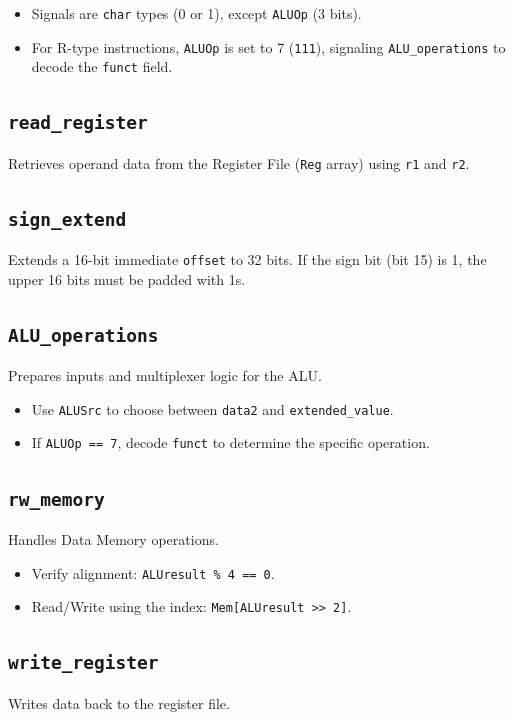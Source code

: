 \begin{itemize}
    \item Signals are \texttt{char} types (0 or 1), except \texttt{ALUOp} (3 bits).
    \item For R-type instructions, \texttt{ALUOp} is set to 7 (\texttt{111}), signaling \texttt{ALU\_operations} to decode the \texttt{funct} field.
\end{itemize}

\subsection{\texttt{read\_register}}
Retrieves operand data from the Register File (\texttt{Reg} array) using \texttt{r1} and \texttt{r2}.

\subsection{\texttt{sign\_extend}}
Extends a 16-bit immediate \texttt{offset} to 32 bits. If the sign bit (bit 15) is 1, the upper 16 bits must be padded with 1s.

\subsection{\texttt{ALU\_operations}}
Prepares inputs and multiplexer logic for the ALU.

\begin{itemize}
    \item Use \texttt{ALUSrc} to choose between \texttt{data2} and \texttt{extended\_value}.
    \item If \texttt{ALUOp == 7}, decode \texttt{funct} to determine the specific operation.
\end{itemize}

\subsection{\texttt{rw\_memory}}
Handles Data Memory operations.

\begin{itemize}
    \item Verify alignment: \texttt{ALUresult \% 4 == 0}.
    \item Read/Write using the index: \texttt{Mem[ALUresult >> 2]}.
\end{itemize}

\subsection{\texttt{write\_register}}
Writes data back to the register file.

